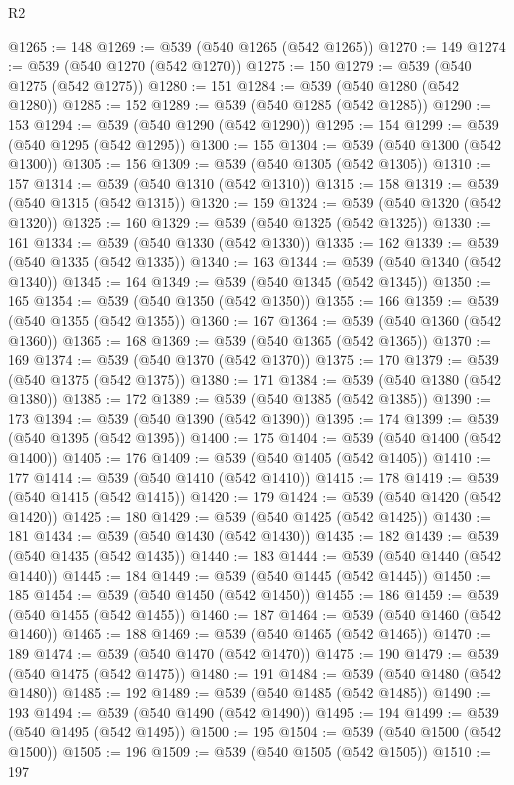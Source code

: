 \begin{lexlean}{R2}
\begin{coremodule}
@1265 := 148
@1269 := @539 (@540 @1265 (@542 @1265))
@1270 := 149
@1274 := @539 (@540 @1270 (@542 @1270))
@1275 := 150
@1279 := @539 (@540 @1275 (@542 @1275))
@1280 := 151
@1284 := @539 (@540 @1280 (@542 @1280))
@1285 := 152
@1289 := @539 (@540 @1285 (@542 @1285))
@1290 := 153
@1294 := @539 (@540 @1290 (@542 @1290))
@1295 := 154
@1299 := @539 (@540 @1295 (@542 @1295))
@1300 := 155
@1304 := @539 (@540 @1300 (@542 @1300))
@1305 := 156
@1309 := @539 (@540 @1305 (@542 @1305))
@1310 := 157
@1314 := @539 (@540 @1310 (@542 @1310))
@1315 := 158
@1319 := @539 (@540 @1315 (@542 @1315))
@1320 := 159
@1324 := @539 (@540 @1320 (@542 @1320))
@1325 := 160
@1329 := @539 (@540 @1325 (@542 @1325))
@1330 := 161
@1334 := @539 (@540 @1330 (@542 @1330))
@1335 := 162
@1339 := @539 (@540 @1335 (@542 @1335))
@1340 := 163
@1344 := @539 (@540 @1340 (@542 @1340))
@1345 := 164
@1349 := @539 (@540 @1345 (@542 @1345))
@1350 := 165
@1354 := @539 (@540 @1350 (@542 @1350))
@1355 := 166
@1359 := @539 (@540 @1355 (@542 @1355))
@1360 := 167
@1364 := @539 (@540 @1360 (@542 @1360))
@1365 := 168
@1369 := @539 (@540 @1365 (@542 @1365))
@1370 := 169
@1374 := @539 (@540 @1370 (@542 @1370))
@1375 := 170
@1379 := @539 (@540 @1375 (@542 @1375))
@1380 := 171
@1384 := @539 (@540 @1380 (@542 @1380))
@1385 := 172
@1389 := @539 (@540 @1385 (@542 @1385))
@1390 := 173
@1394 := @539 (@540 @1390 (@542 @1390))
@1395 := 174
@1399 := @539 (@540 @1395 (@542 @1395))
@1400 := 175
@1404 := @539 (@540 @1400 (@542 @1400))
@1405 := 176
@1409 := @539 (@540 @1405 (@542 @1405))
@1410 := 177
@1414 := @539 (@540 @1410 (@542 @1410))
@1415 := 178
@1419 := @539 (@540 @1415 (@542 @1415))
@1420 := 179
@1424 := @539 (@540 @1420 (@542 @1420))
@1425 := 180
@1429 := @539 (@540 @1425 (@542 @1425))
@1430 := 181
@1434 := @539 (@540 @1430 (@542 @1430))
@1435 := 182
@1439 := @539 (@540 @1435 (@542 @1435))
@1440 := 183
@1444 := @539 (@540 @1440 (@542 @1440))
@1445 := 184
@1449 := @539 (@540 @1445 (@542 @1445))
@1450 := 185
@1454 := @539 (@540 @1450 (@542 @1450))
@1455 := 186
@1459 := @539 (@540 @1455 (@542 @1455))
@1460 := 187
@1464 := @539 (@540 @1460 (@542 @1460))
@1465 := 188
@1469 := @539 (@540 @1465 (@542 @1465))
@1470 := 189
@1474 := @539 (@540 @1470 (@542 @1470))
@1475 := 190
@1479 := @539 (@540 @1475 (@542 @1475))
@1480 := 191
@1484 := @539 (@540 @1480 (@542 @1480))
@1485 := 192
@1489 := @539 (@540 @1485 (@542 @1485))
@1490 := 193
@1494 := @539 (@540 @1490 (@542 @1490))
@1495 := 194
@1499 := @539 (@540 @1495 (@542 @1495))
@1500 := 195
@1504 := @539 (@540 @1500 (@542 @1500))
@1505 := 196
@1509 := @539 (@540 @1505 (@542 @1505))
@1510 := 197

\end{coremodule}
\end{lexlean}
